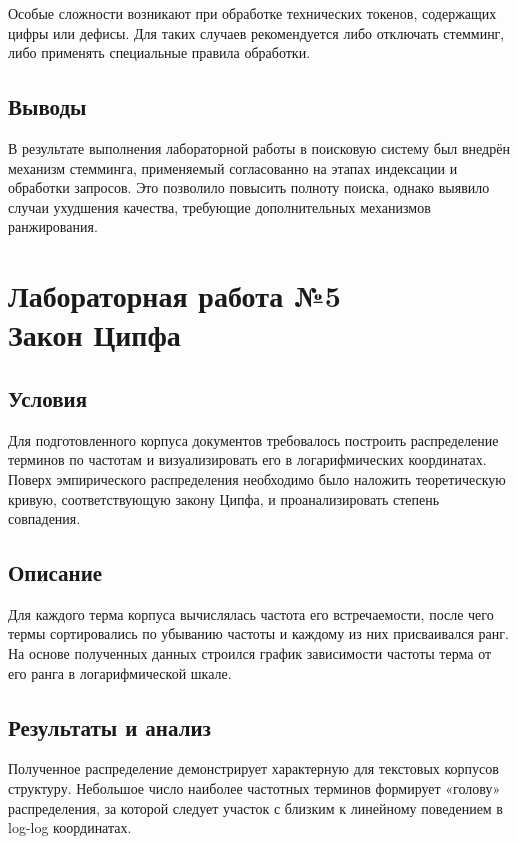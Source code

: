 \documentclass[12pt,a4paper]{article}
\begin{document}
Особые сложности возникают при обработке технических токенов, содержащих цифры или дефисы. Для таких случаев рекомендуется либо отключать стемминг, либо применять специальные правила обработки.

\subsection*{Выводы}

В результате выполнения лабораторной работы в поисковую систему был внедрён механизм стемминга, применяемый согласованно на этапах индексации и обработки запросов. Это позволило повысить полноту поиска, однако выявило случаи ухудшения качества, требующие дополнительных механизмов ранжирования.

\newpage
\section*{Лабораторная работа №5\\
Закон Ципфа}

\subsection*{Условия}

Для подготовленного корпуса документов требовалось построить распределение терминов по частотам и визуализировать его в логарифмических координатах. Поверх эмпирического распределения необходимо было наложить теоретическую кривую, соответствующую закону Ципфа, и проанализировать степень совпадения.

\subsection*{Описание}

Для каждого терма корпуса вычислялась частота его встречаемости, после чего термы сортировались по убыванию частоты и каждому из них присваивался ранг. На основе полученных данных строился график зависимости частоты терма от его ранга в логарифмической шкале.

\subsection*{Результаты и анализ}

Полученное распределение демонстрирует характерную для текстовых корпусов структуру. Небольшое число наиболее частотных терминов формирует «голову» распределения, за которой следует участок с близким к линейному поведением в log-log координатах.
\end{document}

